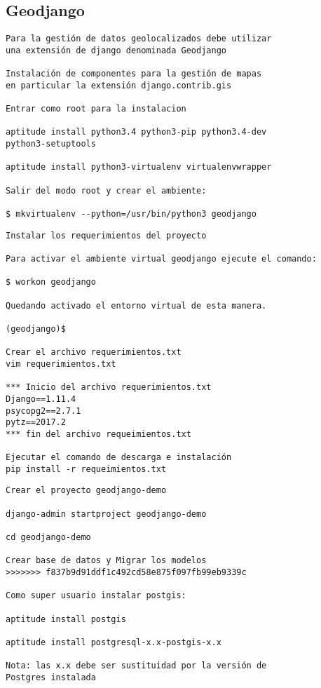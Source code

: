 \documentclass[xcolor=dvipsnames]{beamer}
\begin{document}
\subsection{Geodjango}
\begin{frame}[fragile]
\begin{verbatim}
Para la gestión de datos geolocalizados debe utilizar 
una extensión de django denominada Geodjango

Instalación de componentes para la gestión de mapas
en particular la extensión django.contrib.gis

Entrar como root para la instalacion

aptitude install python3.4 python3-pip python3.4-dev 
python3-setuptools

aptitude install python3-virtualenv virtualenvwrapper

Salir del modo root y crear el ambiente:

$ mkvirtualenv --python=/usr/bin/python3 geodjango
\end{verbatim}
\end{frame}

\begin{frame}[fragile]
\begin{verbatim}
Instalar los requerimientos del proyecto

Para activar el ambiente virtual geodjango ejecute el comando:

$ workon geodjango

Quedando activado el entorno virtual de esta manera.

(geodjango)$

Crear el archivo requerimientos.txt
vim requerimientos.txt

*** Inicio del archivo requerimientos.txt
Django==1.11.4
psycopg2==2.7.1
pytz==2017.2
*** fin del archivo requeimientos.txt

Ejecutar el comando de descarga e instalación
pip install -r requeimientos.txt
\end{verbatim}
\end{frame}

\begin{frame}[fragile]
\begin{verbatim}
Crear el proyecto geodjango-demo

django-admin startproject geodjango-demo

cd geodjango-demo

Crear base de datos y Migrar los modelos
>>>>>>> f837b9d91ddf1c492cd58e875f097fb99eb9339c

Como super usuario instalar postgis:

aptitude install postgis

aptitude install postgresql-x.x-postgis-x.x

Nota: las x.x debe ser sustituidad por la versión de 
Postgres instalada
\end{verbatim}
\end{frame}
\end{document}
